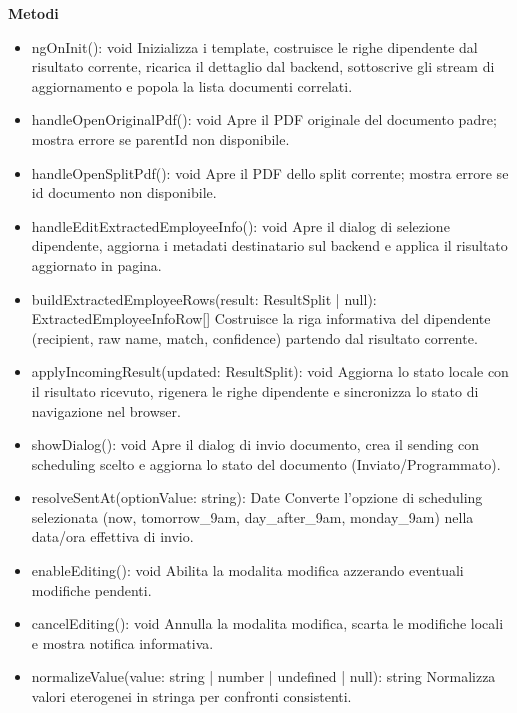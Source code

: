 \documentclass[a4paper,11pt]{article}
\begin{document}
\textbf{Metodi}
\begin{itemize}[noitemsep, topsep=0pt]
\item ngOnInit(): void
Inizializza i template, costruisce le righe dipendente dal risultato corrente, ricarica il dettaglio dal backend, sottoscrive gli stream di aggiornamento e popola la lista documenti correlati.

\item handleOpenOriginalPdf(): void
Apre il PDF originale del documento padre; mostra errore se parentId non disponibile.

\item handleOpenSplitPdf(): void
Apre il PDF dello split corrente; mostra errore se id documento non disponibile.

\item handleEditExtractedEmployeeInfo(): void
Apre il dialog di selezione dipendente, aggiorna i metadati destinatario sul backend e applica il risultato aggiornato in pagina.

\item buildExtractedEmployeeRows(result: ResultSplit | null): ExtractedEmployeeInfoRow[]
Costruisce la riga informativa del dipendente (recipient, raw name, match, confidence) partendo dal risultato corrente.

\item applyIncomingResult(updated: ResultSplit): void
Aggiorna lo stato locale con il risultato ricevuto, rigenera le righe dipendente e sincronizza lo stato di navigazione nel browser.

\item showDialog(): void
Apre il dialog di invio documento, crea il sending con scheduling scelto e aggiorna lo stato del documento (Inviato/Programmato).

\item resolveSentAt(optionValue: string): Date
Converte l’opzione di scheduling selezionata (now, tomorrow_9am, day_after_9am, monday_9am) nella data/ora effettiva di invio.

\item enableEditing(): void
Abilita la modalita modifica azzerando eventuali modifiche pendenti.

\item cancelEditing(): void
Annulla la modalita modifica, scarta le modifiche locali e mostra notifica informativa.

\item normalizeValue(value: string | number | undefined | null): string
Normalizza valori eterogenei in stringa per confronti consistenti.


\end{itemize}
\end{document}
